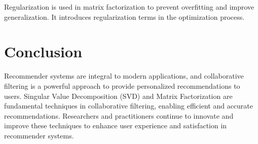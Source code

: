 \documentclass{article}
\begin{document}
Regularization is used in matrix factorization to prevent overfitting and improve generalization. It introduces regularization terms in the optimization process.

\section{Conclusion}

Recommender systems are integral to modern applications, and collaborative filtering is a powerful approach to provide personalized recommendations to users. Singular Value Decomposition (SVD) and Matrix Factorization are fundamental techniques in collaborative filtering, enabling efficient and accurate recommendations. Researchers and practitioners continue to innovate and improve these techniques to enhance user experience and satisfaction in recommender systems.
\end{document}
